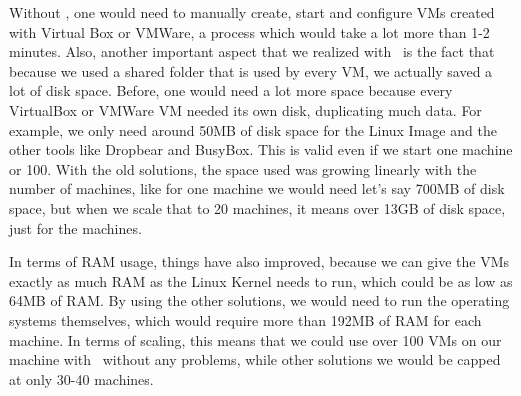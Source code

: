 Without \project, one would need to manually create, start and configure VMs created with Virtual Box or VMWare, a process which would take a lot more than 1-2 minutes.
Also, another important aspect that we realized with \project\ is the fact that because we used a shared folder that is used by every VM, we actually saved a lot of disk space.
Before, one would need a lot more space because every VirtualBox or VMWare VM needed its own disk, duplicating much data.
For example, we only need around 50MB of disk space for the Linux Image and the other tools like Dropbear and BusyBox.
This is valid even if we start one machine or 100.
With the old solutions, the space used was growing linearly with the number of machines, like for one machine we would need let's say 700MB of disk space, but when we scale that to 20 machines, it means over 13GB of disk space, just for the machines.

In terms of RAM usage, things have also improved, because we can give the VMs exactly as much RAM as the Linux Kernel needs to run, which could be as low as 64MB of RAM.
By using the other solutions, we would need to run the operating systems themselves, which would require more than 192MB of RAM for each machine.
In terms of scaling, this means that we could use over 100 VMs on our machine with \project\ without any problems, while other solutions we would be capped at only 30-40 machines.
